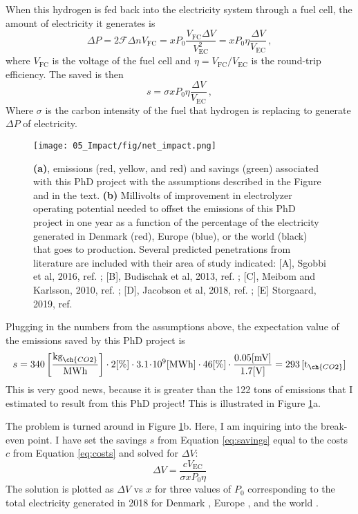 When this hydrogen is fed back into the electricity system through a fuel cell, the amount of electricity it generates is
\begin{equation}
\Delta P = 2\mathcal{F} \Delta n V_\text{FC} = xP_0 \frac{V_\text{FC}\Delta V}{V_\text{EC}^2} = xP_0\eta \frac{\Delta V}{V_\text{EC}}\,,
\end{equation}
where $V_\text{FC}$ is the voltage of the fuel cell and $\eta = V_\text{FC}/V_\text{EC}$ is the round-trip efficiency. The  saved is then
\begin{equation}
s = \sigma x P_0 \eta \frac{\Delta V}{V_\text{EC}}\,,\label{eq:savings}
\end{equation}
Where $\sigma$ is the carbon intensity of the fuel that hydrogen is replacing to generate $\Delta P$ of electricity.
\begin{figure}[h!]
	\texttt{[image: 05\_Impact/fig/net\_impact.png]}
	\caption{\textbf{(a)},  emissions (red, yellow, and red) and savings (green) associated with this PhD project with the assumptions described in the Figure and in the text. \textbf{(b)} Millivolts of improvement in electrolyzer operating potential needed to offset the  emissions of this PhD project in one year as a function of the percentage of the electricity generated in Denmark (red), Europe (blue), or the world (black) that goes to  production. Several predicted  penetrations from literature are included with their area of study indicated: [A], Sgobbi et al, 2016, ref. ; [B], Budischak et al, 2013, ref. ; [C], Meibom and Karlsson, 2010, ref. ; [D], Jacobson et al, 2018, ref. ; [E] Storgaard, 2019, ref. }
	\label{fig:impact}
\end{figure}

Plugging in the numbers from the assumptions above, the expectation value of the  emissions saved by this PhD project is
\begin{equation}
s = 340 \left[\frac{\text{kg}_{\ch{CO2}}}{\text{MWh}}\right] \cdot 2 [\%] \cdot 3.1\!\cdot\! 10^9 \text{[MWh]} \cdot 46 [\%] \cdot \frac{0.05 \text{[mV]}}{1.7 \text{[V]}} = 293 \,[\text{t}_{\ch{CO2}}]
\end{equation}
This is very good news, because it is greater than the 122 tons of  emissions that I estimated to result from this PhD project! This is illustrated in Figure \ref{fig:impact}a.

The problem is turned around in Figure \ref{fig:impact}b. Here, I am inquiring into the break-even point. I have set the savings $s$ from Equation \ref{eq:savings} equal to the costs $c$ from Equation \ref{eq:costs} and solved for $\Delta V$:
\begin{equation}
\Delta V = \frac{c V_\text{EC}}{\sigma x P_0 \eta}
\end{equation}
The solution is plotted as $\Delta V$ vs $x$ for three values of $P_0$ corresponding to the total electricity generated in 2018 for Denmark \cite{EnergiNet}, Europe \cite{EEA2018}, and the world \cite{Enerdata2019}.

